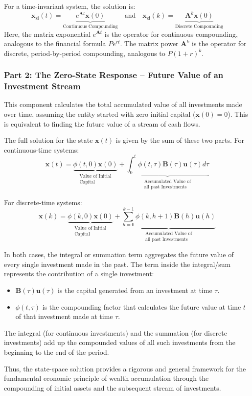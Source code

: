 For a time-invariant system, the solution is:
\begin{equation}
    \mathbf{x}_{\text{zi}}(t) = \underbrace{e^{\mathbf{A}t}\mathbf{x}(0)}_{\text{Continuous Compounding}}
    \quad \text{and} \quad
    \mathbf{x}_{\text{zi}}(k) = \underbrace{\mathbf{A}^k\mathbf{x}(0)}_{\text{Discrete Compounding}}
\end{equation}
Here, the matrix exponential $e^{\mathbf{A}t}$ is the operator for continuous compounding, analogous to the financial formula $P e^{rt}$. The matrix power $\mathbf{A}^k$ is the operator for discrete, period-by-period compounding, analogous to $P(1+r)^k$.

\subsubsection{Part 2: The Zero-State Response -- Future Value of an Investment Stream}

This component calculates the total accumulated value of all investments made over time, assuming the entity started with zero initial capital ($\mathbf{x}(0) = 0$). This is equivalent to finding the future value of a stream of cash flows.

The full solution for the state $\mathbf{x}(t)$ is given by the sum of these two parts. For continuous-time systems:
\begin{equation}
    \mathbf{x}(t) = \underbrace{\phi(t, 0)\mathbf{x}(0)}_{\substack{\text{Value of Initial} \\ \text{Capital}}} + \underbrace{\int_{0}^{t} \phi(t, \tau)\mathbf{B}(\tau)\mathbf{u}(\tau)d\tau}_{\substack{\text{Accumulated Value of} \\ \text{all past Investments}}}
\end{equation}

For discrete-time systems:
\begin{equation}
    \mathbf{x}(k) = \underbrace{\phi(k, 0)\mathbf{x}(0)}_{\substack{\text{Value of Initial} \\ \text{Capital}}} + \underbrace{\sum_{h=0}^{k-1} \phi(k, h+1)\mathbf{B}(h)\mathbf{u}(h)}_{\substack{\text{Accumulated Value of} \\ \text{all past Investments}}}
\end{equation}

In both cases, the integral or summation term aggregates the future value of every single investment made in the past. The term inside the integral/sum represents the contribution of a single investment:
\begin{itemize}
    \item $\mathbf{B}(\tau)\mathbf{u}(\tau)$ is the capital generated from an investment at time $\tau$.
    \item $\phi(t, \tau)$ is the compounding factor that calculates the future value at time $t$ of that investment made at time $\tau$.
\end{itemize}
The integral (for continuous investments) and the summation (for discrete investments) add up the compounded values of all such investments from the beginning to the end of the period.

Thus, the state-space solution provides a rigorous and general framework for the fundamental economic principle of wealth accumulation through the compounding of initial assets and the subsequent stream of investments.






